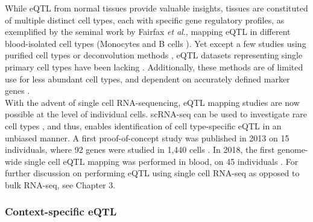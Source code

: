 While eQTL from normal tissues provide valuable insights, tissues are constituted of multiple distinct cell types, each with specific gene regulatory profiles, as exemplified by the seminal work by Fairfax \textit{et al}., mapping eQTL in different blood-isolated cell types (Monocytes and B cells \cite{fairfax2012genetics}).
Yet except a few studies using purified cell types \cite{fairfax2012genetics, kasela2017pathogenic, naranbhai2015genomic} or deconvolution methods \cite{westra2015cell, venet2001separation},
eQTL datasets representing single primary cell types
have been lacking \cite{zhang2018cell}.
Additionally, these methods are 
of limited use for less abundant cell types, and dependent on accurately defined marker genes \cite{zhernakova2017identification}. \\
 
With the advent of single cell RNA-sequencing, eQTL mapping studies are now possible at the level of individual cells. 
scRNA-seq can be used to investigate rare cell types \cite{villani2017single}, and thus, enables identification of cell type-specific eQTL in an unbiased manner. 
A first proof-of-concept study was published in 2013 on 15 individuals, where 92 genes were studied in 1,440 cells \cite{wills2013single}.
In 2018, the first genome-wide single cell eQTL mapping was performed in blood, on 45 individuals \cite{van2018single}.
For further discussion on performing eQTL using single cell RNA-seq as opposed to bulk RNA-seq, see Chapter 3.

\subsubsection{Context-specific eQTL}

